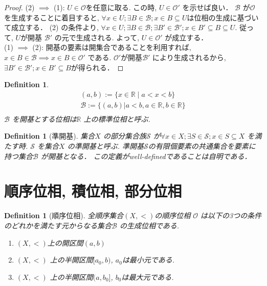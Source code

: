\documentclass[lualatex]{ltjsbook}
\newtheorem{definition}[theorem]{Definition}
\theoremstyle{remark}
\theoremstyle{plain}
\begin{document}
\begin{proof}
	(2) $ \implies $ (1): $U \in \mathcal{O} $を任意に取る.
	この時,  $U \in \mathcal{O'}$ を示せば良い．
	$\mathcal{B}  $ が$\mathcal{O}$ を生成することに着目すると,  $\forall x \in U; \exists B \in \mathcal{B}; x \in B \subseteq U$は位相の生成に基づいて成立する．
	(2) の条件より,  $\forall x \in U; \exists B \in \mathcal{B};\exists B' \in \mathcal{B'}; x \in B' \subseteq B \subseteq U$. 
	従って,  $U$が開基 $\mathcal{B'}$ の元で生成される. 
	よって,  $U \in \mathcal{O'}$ が成立する．\\
	(1) $\implies $ (2): 開基の要素は開集合であることを利用すれば,  
	$x \in B \in \mathcal{B} \implies x \in B \in \mathcal{O'}$ である.
	$\mathcal{O'}$が開基$\mathcal{B'}$ により生成されるから,  
	$\exists B' \in \mathcal{B'} ; x \in B' \subseteq B$が得られる．

\end{proof}

\begin{definition}
	$$
	\begin{array}{c}
	(a, b):= \{ x \in \mathbb{R}  \mid a <x<b  \}\\
	\mathcal{B}:= \{ \left( a , b \right) |a<b,  a \in \mathbb{R} ,  b \in \mathbb{R} \} \\
	\end{array}
	$$
	$\mathcal{B}$ を開基とする位相は$\mathbb{R}$ 上の標準位相と呼ぶ.
\end{definition}


\begin{definition}[準開基]
	集合$X$ の部分集合族$\mathcal{S}$ が$\forall x \in X; \exists S \in \mathcal{S} ; x \in S \subseteq X$ を満たす時.
	$\mathcal{S}$ を集合$X$ の準開基と呼ぶ. 
	準開基$\mathcal{S}$の有限個要素の共通集合を要素に持つ集合$\mathcal{B}$ が開基となる．
	この定義がwell-definedであることは自明である．
\end{definition}

\section{順序位相,  積位相,  部分位相}

\begin{definition}[順序位相]
全順序集合$(X, <)$の順序位相 $\mathcal{O}$ は以下の3つの条件のどれかを満たす元からなる集合$\mathcal{B}$ の生成位相である.

\begin{enumerate}
	\item $\left( X,  < \right) $上の開区間$\left( a, b \right) $
	\item $\left( X, < \right) $ 上の半開区間$[a_0, b)$,  $a_0$は最小元である.
	\item  $\left( X,  < \right) $ 上の半開区間$(a, b_0]$,  $b_0$は最大元である.
\end{enumerate}

\end{definition}
\end{document}
